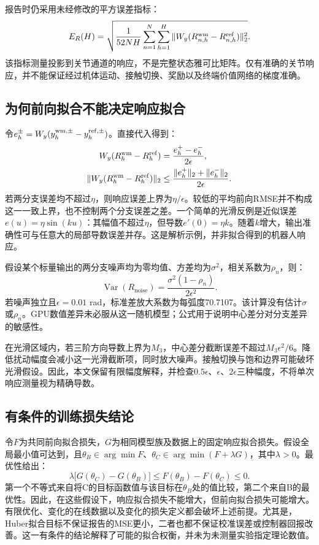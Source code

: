 报告时仍采用未经修改的平方误差指标：
\begin{equation}
E_R(H)=\sqrt{\frac{1}{52NH}\sum_{n=1}^{N}\sum_{h=1}^{H}
\|W_y(R_{n,h}^{\mathrm{wm}}-R_{n,h}^{\mathrm{ref}})\|_2^2}.
\label{eq:metric}
\end{equation}
该指标测量投影到关节通道的响应，不是完整状态雅可比矩阵。仅有准确的关节响应，并不能保证经过机体运动、接触切换、奖励以及终端价值网络的梯度准确。

\subsection{为何前向拟合不能决定响应拟合}
令$e_h^\pm=W_y(y_h^{\mathrm{wm},\pm}-y_h^{\mathrm{ref},\pm})$。直接代入得到：
\begin{equation}
\begin{aligned}
W_y(R_h^{\mathrm{wm}}-R_h^{\mathrm{ref}})&=\frac{e_h^+-e_h^-}{2\epsilon},\\
\|W_y(R_h^{\mathrm{wm}}-R_h^{\mathrm{ref}})\|_2
&\le\frac{\|e_h^+\|_2+\|e_h^-\|_2}{2\epsilon}.
\end{aligned}\label{eq:branchbound}
\end{equation}
若两分支误差均不超过$\eta$，则响应误差上界为$\eta/\epsilon$。较低的平均前向RMSE并不构成这一一致上界，也不控制两个分支误差之差。一个简单的光滑反例是近似误差$e(u)=\eta\sin(ku)$：其幅值不超过$\eta$，但导数$e'(0)=\eta k$。随着$k$增大，输出准确性可与任意大的局部导数误差并存。这是解析示例，并非拟合得到的机器人响应。

假设某个标量输出的两分支噪声均为零均值、方差均为$\sigma^2$，相关系数为$\rho_n$，则：
\begin{equation}
\operatorname{Var}(R_{\mathrm{noise}})
=\frac{\sigma^2(1-\rho_n)}{2\epsilon^2}.
\label{eq:noise}
\end{equation}
若噪声独立且$\epsilon=0.01$ rad，标准差放大系数为每弧度70.7107。该计算没有估计$\sigma$或$\rho_n$。GPU数值差异未必服从这一随机模型；公式用于说明中心差分对分支差异的敏感性。

在光滑区域内，若三阶方向导数上界为$M_3$，中心差分截断误差不超过$M_3\epsilon^2/6$。降低扰动幅度会减小这一光滑截断项，同时放大噪声。接触切换与饱和边界可能破坏光滑假设。因此，本文保留有限幅度解释，并检查$0.5\epsilon$、$\epsilon$、$2\epsilon$三种幅度，不将单次响应测量视为精确导数。

\subsection{有条件的训练损失结论}
令$F$为共同前向拟合损失，$G$为相同模型族及数据上的固定响应拟合损失。假设全局最小值可达到，且$\theta_B\in\arg\min F$、$\theta_C\in\arg\min(F+\lambda G)$，其中$\lambda>0$。最优性给出：
\begin{equation}
\lambda\bigl[G(\theta_C)-G(\theta_B)\bigr]
\le F(\theta_B)-F(\theta_C)\le0.
\label{eq:optimality}
\end{equation}
第一个不等式来自将C的目标函数值与该目标在$\theta_B$处的值比较，第二个来自B的最优性。因此，在这些假设下，响应拟合损失不能增大，但前向拟合损失可能增大。有限优化、变化的在线数据以及变化的损失定义都会破坏上述前提。尤其是，Huber拟合目标不保证报告的MSE更小，二者也都不保证校准误差或控制器回报改善。这一有条件的结论解释了可能的拟合权衡，并未为未测量实验指定理论数值。

